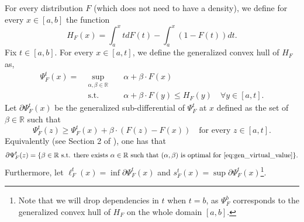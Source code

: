 For every distribution $F$ (which does not need to have a density), we define for every $x \in [a,b]$ the function
\begin{equation*}
H_{F}(x) = \int_{a}^x t  dF(t) - \int_a^x (1-F(t))dt.
\end{equation*}
Fix $t \in [a,b]$. For every $x \in [a,t]$, we define the generalized convex hull of $H_F$ as,
\begin{subequations}
\label{eq:gen_virtual_value}
\begin{alignat}{2}
\Psi_{F}^t(x) = \; &\!\sup_{\alpha,\beta \in \mathbb{R}} &\;& \alpha + \beta \cdot F(x) \\
&\text{s.t.} &      &  \alpha + \beta \cdot F(y) \leq H_{F}(y) \quad \forall y \in [a,t]. 
\end{alignat}
\end{subequations}
Let $\partial \Psi_{F}^t(x)$ be the generalized sub-differential of $\Psi_{F}^t$ at $x$ defined as the set of $\beta \in \mathbb{R}$ such that
\begin{equation}
\label{eq:subgradient}
\Psi_{F}^t(z) \geq \Psi^t_{F}(x) + \beta \cdot (F(z) - F(x)) \quad \text{for every $z \in [a,t]$}.  
\end{equation}
Equivalently (see Section 2 of \citet{monteiro2010optimal}), one has that
\begin{equation}
    \label{eq:subgrad_are_solutions}
    \partial \Psi_{F}^t(z) = \{ \beta \in \mathbb{R} \text{ s.t. there exists $\alpha \in \mathbb{R}$ such that $(\alpha,\beta)$ is optimal for \eqref{eq:gen_virtual_value}} \}.
\end{equation}
Furthermore, let $\ell^t_{F}(x) = \inf \partial \Psi^t_{F}(x)$ and $s^t_{F}(x) = \sup \partial \Psi^t_{F}(x)$\footnote{Note that we will drop dependencies in $t$ when $t = b$, as $\Psi_F^b$ corresponds to the generalized convex hull of $H_F$ on the whole domain $[a,b]$.
}.

